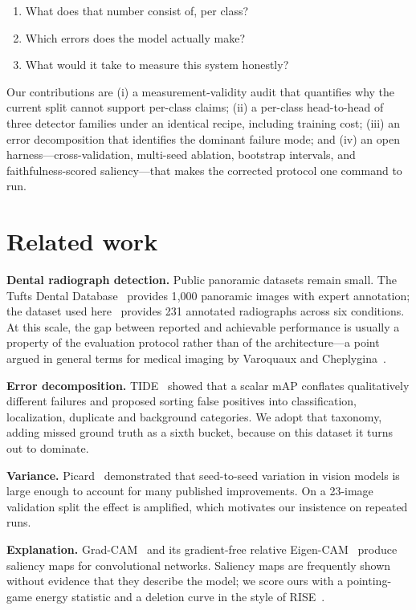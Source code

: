 \documentclass[10pt,twocolumn]{article}
\begin{document}
\begin{enumerate}\itemsep1pt
\item What does that number consist of, per class?
\item Which errors does the model actually make?
\item What would it take to measure this system honestly?
\end{enumerate}

\noindent
Our contributions are (i) a measurement-validity audit that quantifies why the
current split cannot support per-class claims; (ii) a per-class head-to-head of
three detector families under an identical recipe, including training cost;
(iii) an error decomposition that identifies the dominant failure mode; and
(iv) an open harness---cross-validation, multi-seed ablation, bootstrap
intervals, and faithfulness-scored saliency---that makes the corrected protocol
one command to run.

\section{Related work}

\textbf{Dental radiograph detection.} Public panoramic datasets remain small.
The Tufts Dental Database~\cite{panetta2021tufts} provides 1{,}000 panoramic
images with expert annotation; the dataset used here~\cite{mendeley2023dentalopg}
provides 231 annotated radiographs across six conditions. At this scale, the
gap between reported and achievable performance is usually a property of the
evaluation protocol rather than of the architecture---a point argued in general
terms for medical imaging by Varoquaux and Cheplygina~\cite{varoquaux2022machine}.

\textbf{Error decomposition.} TIDE~\cite{bolya2020tide} showed that a scalar mAP
conflates qualitatively different failures and proposed sorting false positives
into classification, localization, duplicate and background categories. We adopt
that taxonomy, adding missed ground truth as a sixth bucket, because on this
dataset it turns out to dominate.

\textbf{Variance.} Picard~\cite{picard2021torchmanualseed} demonstrated that
seed-to-seed variation in vision models is large enough to account for many
published improvements. On a 23-image validation split the effect is amplified,
which motivates our insistence on repeated runs.

\textbf{Explanation.} Grad-CAM~\cite{selvaraju2017gradcam} and its gradient-free
relative Eigen-CAM~\cite{muhammad2020eigencam} produce saliency maps for
convolutional networks. Saliency maps are frequently shown without evidence that
they describe the model; we score ours with a pointing-game energy statistic and
a deletion curve in the style of RISE~\cite{petsiuk2018rise}.
\end{document}
